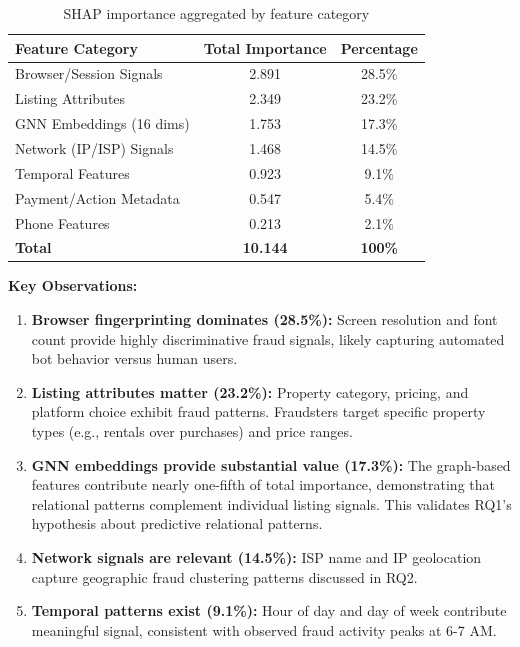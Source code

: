 \begin{table}[h]
\centering
\caption{SHAP importance aggregated by feature category}
\begin{tabular}{lcc}
\hline
\textbf{Feature Category} & \textbf{Total Importance} & \textbf{Percentage} \\
\hline
Browser/Session Signals & 2.891 & 28.5\% \\
Listing Attributes & 2.349 & 23.2\% \\
GNN Embeddings (16 dims) & 1.753 & 17.3\% \\
Network (IP/ISP) Signals & 1.468 & 14.5\% \\
Temporal Features & 0.923 & 9.1\% \\
Payment/Action Metadata & 0.547 & 5.4\% \\
Phone Features & 0.213 & 2.1\% \\
\hline
\textbf{Total} & \textbf{10.144} & \textbf{100\%} \\
\hline
\end{tabular}
\end{table}

\textbf{Key Observations:}

\begin{enumerate}
    \item \textbf{Browser fingerprinting dominates (28.5\%):} Screen resolution and font count provide highly discriminative fraud signals, likely capturing automated bot behavior versus human users.

    \item \textbf{Listing attributes matter (23.2\%):} Property category, pricing, and platform choice exhibit fraud patterns. Fraudsters target specific property types (e.g., rentals over purchases) and price ranges.

    \item \textbf{GNN embeddings provide substantial value (17.3\%):} The graph-based features contribute nearly one-fifth of total importance, demonstrating that relational patterns complement individual listing signals. This validates RQ1's hypothesis about predictive relational patterns.

    \item \textbf{Network signals are relevant (14.5\%):} ISP name and IP geolocation capture geographic fraud clustering patterns discussed in RQ2.

    \item \textbf{Temporal patterns exist (9.1\%):} Hour of day and day of week contribute meaningful signal, consistent with observed fraud activity peaks at 6-7 AM.
\end{enumerate}

